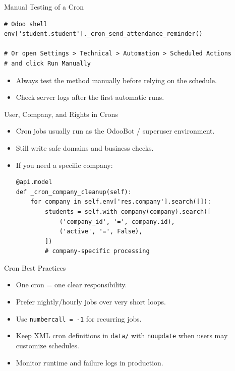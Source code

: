 \begin{frame}[fragile]{Manual Testing of a Cron}
\begin{lstlisting}
# Odoo shell
env['student.student']._cron_send_attendance_reminder()

# Or open Settings > Technical > Automation > Scheduled Actions
# and click Run Manually
\end{lstlisting}
	\begin{itemize}
		\item Always test the method manually before relying on the schedule.
		\item Check server logs after the first automatic runs.
	\end{itemize}
\end{frame}

\begin{frame}[fragile]{User, Company, and Rights in Crons}
	\begin{itemize}
		\item Cron jobs usually run as the OdooBot / superuser environment.
		\item Still write safe domains and business checks.
		\item If you need a specific company:
\begin{lstlisting}
@api.model
def _cron_company_cleanup(self):
	for company in self.env['res.company'].search([]):
		students = self.with_company(company).search([
			('company_id', '=', company.id),
			('active', '=', False),
		])
		# company-specific processing
\end{lstlisting}
	\end{itemize}
\end{frame}

\begin{frame}{Cron Best Practices}
	\begin{itemize}
		\item One cron = one clear responsibility.
		\item Prefer nightly/hourly jobs over very short loops.
		\item Use \texttt{numbercall = -1} for recurring jobs.
		\item Keep XML cron definitions in \texttt{data/} with \texttt{noupdate} when users may customize schedules.
		\item Monitor runtime and failure logs in production.
	\end{itemize}
\end{frame}
